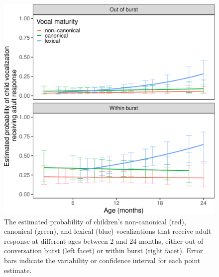 \documentclass[
  man]{apa6}
\begin{document}
\begin{figure}
\centering
\includegraphics{turntaking_paper_files/figure-latex/adult-response-model-plot-1.pdf}
\caption{\label{fig:adult-response-model-plot}The estimated probability of children's non-canonical (red), canonical (green), and lexical (blue) vocalizations that receive adult response at different ages between 2 and 24 months, either out of conversation burst (left facet) or within burst (right facet). Error bars indicate the variability or confidence interval for each point estimate.}
\end{figure}
\end{document}
